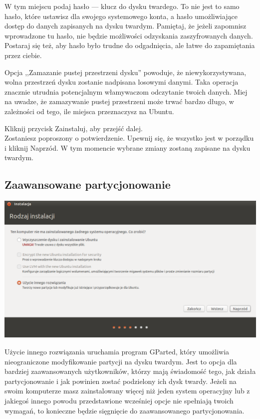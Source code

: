 W tym miejscu podaj hasło --- klucz do dysku twardego. To nie jest to samo hasło, które ustawisz dla swojego systemowego konta, a hasło umożliwiające dostęp do danych zapisanych na dysku twardym. Pamiętaj, że jeżeli zapomnisz wprowadzone tu hasło, nie będzie możliwości odzyskania zaszyfrowanych danych. Postaraj się też, aby hasło było trudne do odgadnięcia, ale łatwe do zapamiętania przez ciebie.

Opcja ,,Zamazanie pustej przestrzeni dysku'' powoduje, że niewykorzystywana, wolna przestrzeń dysku zostanie nadpisana losowymi danymi. Taka operacja znacznie utrudnia potencjalnym włamywaczom odczytanie twoich danych. Miej na uwadze, że zamazywanie pustej przestrzeni może trwać bardzo długo, w zależności od tego, ile miejsca przeznaczysz na Ubuntu.
\begin{flushright}
Kliknij przycisk \textcolor{ubuntu_orange}{Zainstaluj}, aby przejść dalej.\\
Zostaniesz poproszony o potwierdzenie. Upewnij się, że wszystko jest w porządku i kliknij \textcolor{ubuntu_orange}{Naprzód}.
W tym momencie wybrane zmiany zostaną zapisane na dysku twardym.\\
\end{flushright}

\subsection{Zaawansowane partycjonowanie}
\begin{center}
        \includegraphics[width=\linewidth]{images/instalator_partycjonowanie_gparted1.png}
\end{center}

\textcolor{ubuntu_orange}{Użycie innego rozwiązania} uruchamia program GParted, który umożliwia nieograniczone modyfikowanie partycji na dysku twardym. Jest to opcja dla bardziej zaawansowanych użytkowników, którzy mają świadomość tego, jak działa partycjonowanie i jak powinien zostać podzielony ich dysk twardy. Jeżeli na swoim komputerze masz zainstalowany więcej niż jeden system operacyjny lub z jakiegoś innego powodu przedstawione wcześniej opcje nie spełniają twoich wymagań, to konieczne będzie sięgnięcie do zaawansowanego partycjonowania.

